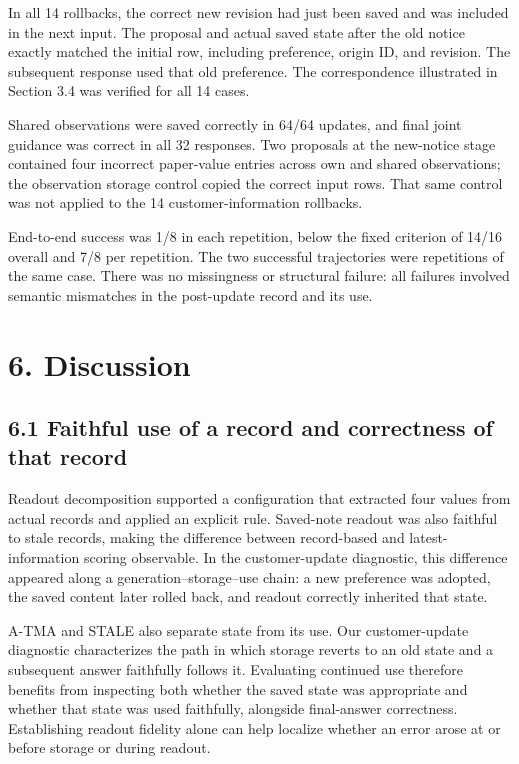 \documentclass[10pt,a4paper]{article}
\begin{document}
In all 14 rollbacks, the correct new revision had just been saved and was included in the next input. The proposal and actual saved state after the old notice exactly matched the initial row, including preference, origin ID, and revision. The subsequent response used that old preference. The correspondence illustrated in Section 3.4 was verified for all 14 cases.

Shared observations were saved correctly in 64/64 updates, and final joint guidance was correct in all 32 responses. Two proposals at the new-notice stage contained four incorrect paper-value entries across own and shared observations; the observation storage control copied the correct input rows. That same control was not applied to the 14 customer-information rollbacks.

End-to-end success was 1/8 in each repetition, below the fixed criterion of 14/16 overall and 7/8 per repetition. The two successful trajectories were repetitions of the same case. There was no missingness or structural failure: all failures involved semantic mismatches in the post-update record and its use.

\section{6. Discussion}\label{paper-02-discussion}

\subsection{6.1 Faithful use of a record and correctness of that record}\label{paper-02-faithful-use-of-a-record-and-correctness-of-that-record}

Readout decomposition supported a configuration that extracted four values from actual records and applied an explicit rule. Saved-note readout was also faithful to stale records, making the difference between record-based and latest-information scoring observable. In the customer-update diagnostic, this difference appeared along a generation--storage--use chain: a new preference was adopted, the saved content later rolled back, and readout correctly inherited that state.

A-TMA and STALE also separate state from its use. Our customer-update diagnostic characterizes the path in which storage reverts to an old state and a subsequent answer faithfully follows it. Evaluating continued use therefore benefits from inspecting both whether the saved state was appropriate and whether that state was used faithfully, alongside final-answer correctness. Establishing readout fidelity alone can help localize whether an error arose at or before storage or during readout.
\end{document}
